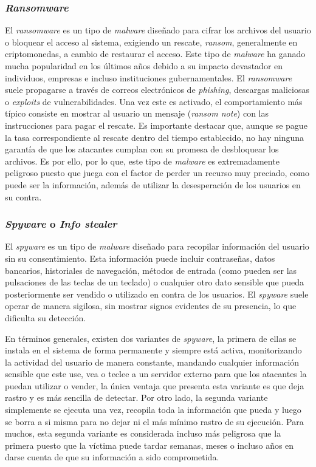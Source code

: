 \subsubsection{\textit{Ransomware}}
El \textit{ransomware} es un tipo de \textit{malware} diseñado para cifrar los archivos del usuario o bloquear el acceso al sistema, exigiendo un rescate, \textit{ransom}, generalmente en criptomonedas, a cambio de restaurar el acceso. Este tipo de \textit{malware} ha ganado mucha popularidad en los últimos años debido a su impacto devastador en individuos, empresas e incluso instituciones gubernamentales. El \textit{ransomware} suele propagarse a través de correos electrónicos de \textit{phishing}, descargas maliciosas o \textit{exploits} de vulnerabilidades. Una vez este es activado, el comportamiento más típico consiste en mostrar al usuario un mensaje (\textit{ransom note}) con las instrucciones para pagar el rescate. Es importante destacar que, aunque se pague la tasa correspondiente al rescate dentro del tiempo establecido, no hay ninguna garantía de que los atacantes cumplan con su promesa de desbloquear los archivos. Es por ello, por lo que, este tipo de \textit{malware} es extremadamente peligroso puesto que juega con el factor de perder un recurso muy preciado, como puede ser la información, además de utilizar la desesperación de los usuarios en su contra.

\subsubsection{\textit{Spyware} o \textit{Info stealer}}
El \textit{spyware} es un tipo de \textit{malware} diseñado para recopilar información del usuario sin su consentimiento. Esta información puede incluir contraseñas, datos bancarios, historiales de navegación, métodos de entrada (como pueden ser las pulsaciones de las teclas de un teclado) o cualquier otro dato sensible que pueda posteriormente ser vendido o utilizado en contra de los usuarios. El \textit{spyware} suele operar de manera sigilosa, sin mostrar signos evidentes de su presencia, lo que dificulta su detección. 

En términos generales, existen dos variantes de \textit{spyware}, la primera de ellas se instala en el sistema de forma permanente y siempre está activa, monitorizando la actividad del usuario de manera constante, mandando cualquier información sensible que este use, vea o teclee a un servidor externo para que los atacantes la puedan utilizar o vender, la única ventaja que presenta esta variante es que deja rastro y es más sencilla de detectar. Por otro lado, la segunda variante simplemente se ejecuta una vez, recopila toda la información que pueda y luego se borra a si misma para no dejar ni el más mínimo rastro de su ejecución. Para muchos, esta segunda variante es considerada incluso más peligrosa que la primera puesto que la víctima puede tardar semanas, meses o incluso años en darse cuenta de que su información a sido comprometida. 

